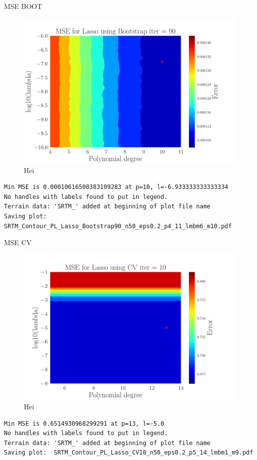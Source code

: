 \documentclass[reprint,english,notitlepage,aps,nobalancelastpage,nofootinbib]{revtex4-1}  %
\begin{document}
MSE BOOT
\begin{figure}[H]
	\includegraphics[width=\linewidth]{SRTM_Contour_PL_Lasso_Bootstrap90_n50_eps0.2_p4_11_lmbm6_m10.pdf}
	\caption{Hei}
	\label{fig:terrain_Lasso_MSE_Boot}
\end{figure}
\begin{verbatim}
Min MSE is 0.00010616500383109283 at p=10, l=-6.933333333333334
No handles with labels found to put in legend.
Terrain data: 'SRTM_' added at beginning of plot file name
Saving plot:  SRTM_Contour_PL_Lasso_Bootstrap90_n50_eps0.2_p4_11_lmbm6_m10.pdf
\end{verbatim}
MSE CV
\begin{figure}[H]
	\includegraphics[width=\linewidth]{SRTM_Contour_PL_Lasso_CV10_n50_eps0.2_p5_14_lmbm1_m9.pdf}
	\caption{Hei}
	\label{fig:terrain_Lasso_MSE_CV}
\end{figure}
\begin{verbatim}
Min MSE is 0.6514930968299291 at p=13, l=-5.0
No handles with labels found to put in legend.
Terrain data: 'SRTM_' added at beginning of plot file name
Saving plot:  SRTM_Contour_PL_Lasso_CV10_n50_eps0.2_p5_14_lmbm1_m9.pdf
\end{verbatim}
\end{document}
